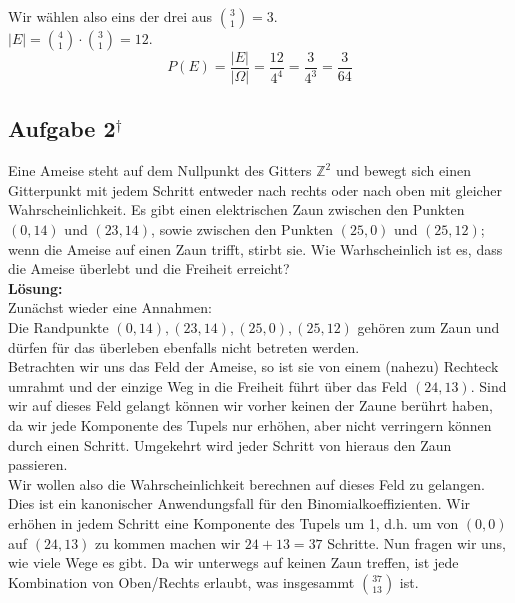 \documentclass[11pt,a4paper,ngerman]{article}
\newcommand{\alex}{$^\dagger$}
\begin{document}
Wir wählen also eins der drei aus $\binom{3}{1} = 3$.\\

$\left|E\right| = \binom{4}{1} \cdot \binom{3}{1} = 12$.\\

\[
    P(E) = \frac{\left|E\right|}{\left|\Omega\right|} = \frac{12}{4^4} = \frac{3}{4^3} = \frac{3}{64}
\]

\subsection*{Aufgabe 2\alex}

Eine Ameise steht auf dem Nullpunkt des Gitters $\mathbb{Z}^2$ und bewegt sich einen Gitterpunkt mit jedem Schritt entweder nach rechts oder nach
oben mit gleicher Wahrscheinlichkeit. Es gibt einen elektrischen Zaun zwischen den Punkten $(0,14)$ und $(23,14)$, sowie zwischen den Punkten $(25,0)$ und
$(25,12)$; wenn die Ameise auf einen Zaun trifft, stirbt sie. Wie Warhscheinlich ist es, dass die Ameise überlebt und die Freiheit erreicht?\\

\textbf{Lösung:}\\

Zunächst wieder eine Annahmen:\\
Die Randpunkte $(0,14), (23,14), (25,0), (25,12)$ gehören zum Zaun und dürfen für das überleben ebenfalls nicht betreten werden.\\

Betrachten wir uns das Feld der Ameise, so ist sie von einem (nahezu) Rechteck umrahmt und der einzige Weg in die Freiheit führt über
das Feld $(24,13)$. Sind wir auf dieses Feld gelangt können wir vorher keinen der Zaune berührt haben, da wir jede Komponente des Tupels nur erhöhen,
aber nicht verringern können durch einen Schritt.
Umgekehrt wird jeder Schritt von hieraus den Zaun passieren.\\

Wir wollen also die Wahrscheinlichkeit berechnen auf dieses Feld zu gelangen.\\
Dies ist ein kanonischer Anwendungsfall für den Binomialkoeffizienten. Wir erhöhen in jedem Schritt eine Komponente des Tupels um 1, d.h.
um von $(0,0)$ auf $(24,13)$ zu kommen machen wir $24+13 = 37$ Schritte. Nun fragen wir uns, wie viele Wege es gibt.
Da wir unterwegs auf keinen Zaun treffen, ist jede Kombination von Oben/Rechts erlaubt, was insgesammt
$ \binom{37}{13} $ ist.\\
\end{document}
